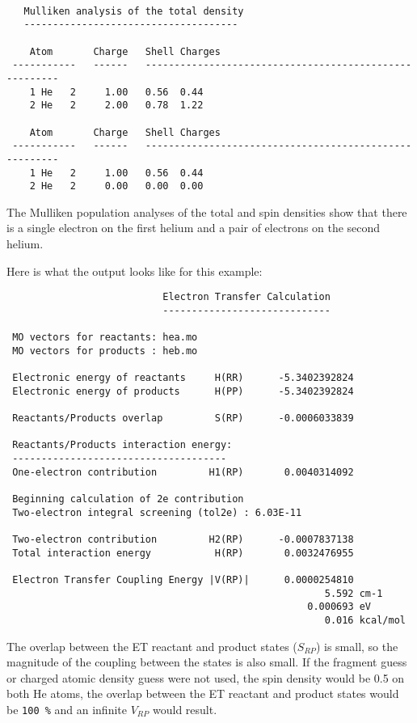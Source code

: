 \begin{verbatim}

   Mulliken analysis of the total density
   -------------------------------------

    Atom       Charge   Shell Charges
 -----------   ------   -------------------------------------------------------
    1 He   2     1.00   0.56  0.44
    2 He   2     2.00   0.78  1.22

    Atom       Charge   Shell Charges
 -----------   ------   -------------------------------------------------------
    1 He   2     1.00   0.56  0.44
    2 He   2     0.00   0.00  0.00
\end{verbatim}
The Mulliken population analyses of the total and spin densities show that there is a single electron on
the first helium and a pair of electrons on the second helium.  

Here is what the output looks like for this example:
\begin{verbatim}
                           Electron Transfer Calculation
                           -----------------------------

 MO vectors for reactants: hea.mo
 MO vectors for products : heb.mo

 Electronic energy of reactants     H(RR)      -5.3402392824
 Electronic energy of products      H(PP)      -5.3402392824

 Reactants/Products overlap         S(RP)      -0.0006033839

 Reactants/Products interaction energy:
 -------------------------------------
 One-electron contribution         H1(RP)       0.0040314092

 Beginning calculation of 2e contribution
 Two-electron integral screening (tol2e) : 6.03E-11

 Two-electron contribution         H2(RP)      -0.0007837138
 Total interaction energy           H(RP)       0.0032476955

 Electron Transfer Coupling Energy |V(RP)|      0.0000254810
                                                       5.592 cm-1
                                                    0.000693 eV
                                                       0.016 kcal/mol

\end{verbatim}

The overlap between the ET reactant and product states ($S_{RP}$) is small,
so the magnitude of the coupling between the states is also small. 
If the fragment guess
or charged atomic density guess were not used, the spin density would be 0.5 on both He atoms, the overlap between
the ET reactant and product states would be \verb+100 %+ and an infinite
$V_{RP}$ would result.
